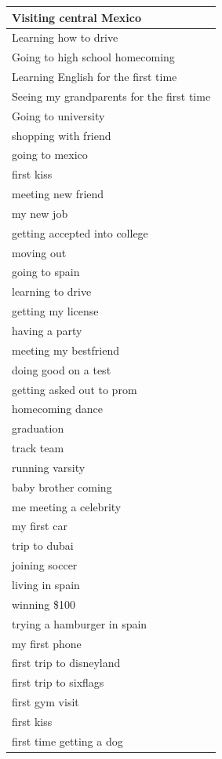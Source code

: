 \documentclass[
  .7em,
  letterpaper,
  DIV=11,
  numbers=noendperiod]{scrartcl}
\begin{document}
\begin{table}
\begin{tabular}{l}
\hline
Visiting central Mexico\\
\hline
Learning how to drive\\
\hline
Going to high school homecoming\\
\hline
Learning English for the first time\\
\hline
Seeing my grandparents for the first time\\
\hline
Going to university\\
\hline
shopping with friend\\
\hline
going to mexico\\
\hline
first kiss\\
\hline
meeting new friend\\
\hline
my new job\\
\hline
getting accepted into college\\
\hline
moving out\\
\hline
going to spain\\
\hline
learning to drive\\
\hline
getting my license\\
\hline
having a party\\
\hline
meeting my bestfriend\\
\hline
doing good on a test\\
\hline
getting asked out to prom\\
\hline
homecoming dance\\
\hline
graduation\\
\hline
track team\\
\hline
running varsity\\
\hline
baby brother coming\\
\hline
me meeting a celebrity\\
\hline
my first car\\
\hline
trip to dubai\\
\hline
joining soccer\\
\hline
living in spain\\
\hline
winning \$100\\
\hline
trying a hamburger in spain\\
\hline
my first phone\\
\hline
first trip to disneyland\\
\hline
first trip to sixflags\\
\hline
first gym visit\\
\hline
first kiss\\
\hline
first time getting a dog\\

\end{tabular}
\end{table}
\end{document}
